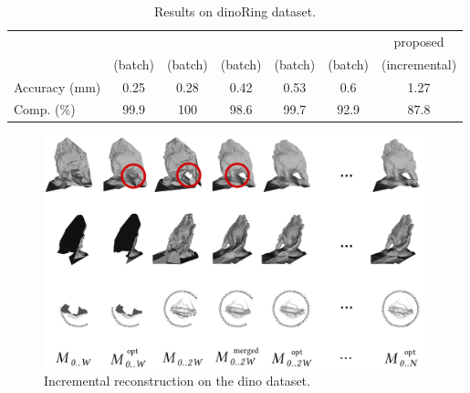 \begin{table}[t]
\normalsize
\centering
\setlength{\tabcolsep}{1px}
  \caption{Results on dinoRing dataset.}
  \label{tab:dinoRes}
    \begin{tabular}{lcccccc}
    \hline
    &
    \cite{savinov2016semantic}&
    \cite{li2015detail}&
    \cite{zaharescu2007transformesh}&
    \cite{hiep2009towards}&%
    \cite{gargallo2007minimizing}&proposed\\
    &(batch)&(batch)&(batch)&(batch)&(batch)&%
    (incremental)\\
    \hline
    Accuracy (mm) &0.25&0.28&0.42&0.53&%
    0.6&1.27\\
    Comp. (\%)&99.9&100&98.6&99.7&%
    92.9&87.8
    \end{tabular}
\end{table}



\begin{figure}
  \centering
  \includegraphics[width=\textwidth]{./img/ch-incr-dens/dino}
  \caption{Incremental reconstruction on the dino dataset.}
  \label{fig:dinoIncr}
\end{figure}



